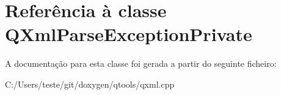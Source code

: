 \hypertarget{class_q_xml_parse_exception_private}{\section{Referência à classe Q\-Xml\-Parse\-Exception\-Private}
\label{class_q_xml_parse_exception_private}
}


A documentação para esta classe foi gerada a partir do seguinte ficheiro\-:\begin{DoxyCompactItemize}
\item 
C\-:/\-Users/teste/git/doxygen/qtools/qxml.\-cpp\end{DoxyCompactItemize}
